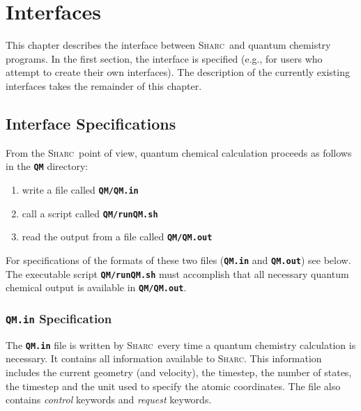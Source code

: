 \documentclass[a4paper,11pt,DIV=15,openany,twoside=false]{scrbook}
\newcommand{\sharc}{\textsc{Sharc}}
\newcommand{\ttt}[1]{\textbf{\texttt{#1}}}
\begin{document}
\chapter{Interfaces}\label{chap:interfaces}

This chapter describes the interface between \sharc\ and quantum chemistry programs. In the first section, the interface is specified (e.g., for users who attempt to create their own interfaces). The description of the currently existing interfaces takes the remainder of this chapter.


\section{Interface Specifications}

From the \sharc\ point of view, quantum chemical calculation proceeds as follows in the \ttt{QM} directory:
\begin{enumerate}
  \item write a file called \ttt{QM/QM.in}
  \item call a script called \ttt{QM/runQM.sh}
  \item read the output from a file called \ttt{QM/QM.out}
\end{enumerate}
For specifications of the formats of these two files (\ttt{QM.in} and \ttt{QM.out}) see below. The executable script \ttt{QM/runQM.sh} must accomplish that all necessary quantum chemical output is available in \ttt{QM/QM.out}.

\subsection{\ttt{QM.in} Specification}\label{intf:qmin}

The \ttt{QM.in} file is written by \sharc\ every time a quantum chemistry calculation is necessary. It contains all information available to \sharc. This information includes the current geometry (and velocity), the timestep, the number of states, the timestep and the unit used to specify the atomic coordinates. The file also contains \textit{control} keywords and \textit{request} keywords. 
\end{document}
